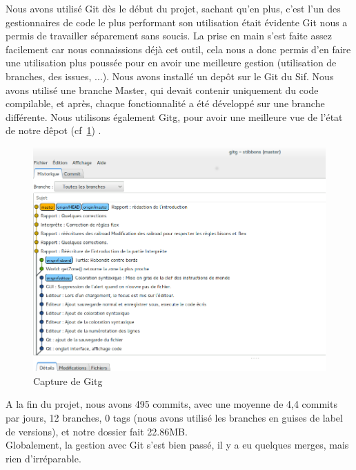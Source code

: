 Nous avons utilisé Git dès le début du projet, sachant qu'en plus, c'est l'un des gestionnaires de code le plus performant son utilisation était évidente
Git nous a permis de travailler séparement sans soucis. La prise en main s'est faite assez facilement car nous connaissions déjà cet outil, cela nous a donc permis d'en faire une utilisation plus poussée pour en avoir une meilleure gestion (utilisation de branches, des issues, ...).
Nous avons installé un depôt sur le Git du Sif. Nous avons utilisé une branche Master, qui devait contenir uniquement du code compilable, et après, chaque fonctionnalité a été développé sur une branche différente.
Nous utilisons également Gitg, pour avoir une meilleure vue de l'état de notre dêpot (cf~\ref{Gitg}) .
\begin{figure}[h]
\caption{\label{Gitg} Capture de Gitg}
\includegraphics[scale=0.35]{doc/gestionProjet/gitbranche.png}
\end{figure}
A la fin du projet, nous avons 495 commits, avec une moyenne de 4,4 commits par jours, 12 branches, 0 tags (nous avons utilisé les branches en guises de label de versions), et notre dossier fait 22.86MB.\\
Globalement, la gestion avec Git s'est bien passé, il y a eu quelques merges, mais rien d'irréparable. 

